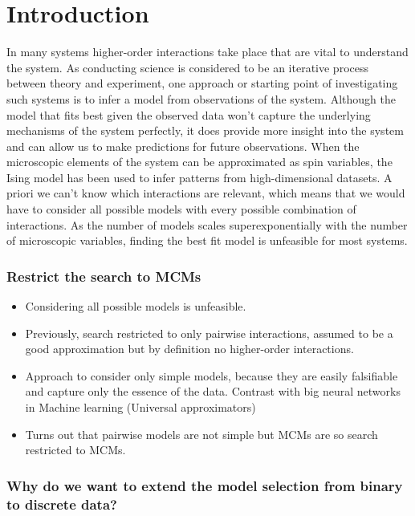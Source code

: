 \section{Introduction}

In many systems higher-order interactions take place that are vital to understand the system\cite{Battiston2021}.
As conducting science is considered to be an iterative process between theory and experiment\cite{Box1976}, one approach or starting point of investigating such systems is to infer a model from observations of the system\cite{Nguyen2017}.
Although the model that fits best given the observed data won't capture the underlying mechanisms of the system perfectly, it does provide more insight into the system and can allow us to make predictions for future observations.
When the microscopic elements of the system can be approximated as spin variables, the Ising model has been used to infer patterns from high-dimensional datasets\cite{Nguyen2017}.
A priori we can't know which interactions are relevant, which means that we would have to consider all possible models with every possible combination of interactions. 
As the number of models scales superexponentially with the number of microscopic variables\cite{Beretta2018}, finding the best fit model is unfeasible for most systems.

\subsubsection*{Restrict the search to MCMs}

\begin{itemize}
    \item Considering all possible models is unfeasible.
    \item Previously, search restricted to only pairwise interactions, assumed to be a good approximation but by definition no higher-order interactions.
    \item Approach to consider only simple models, because they are easily falsifiable and capture only the essence of the data. Contrast with big neural networks in Machine learning (Universal approximators)
    \item Turns out that pairwise models are not simple\cite{Beretta2018} but MCMs are so search restricted to MCMs\cite{Demulatier2020}.
\end{itemize}

\subsubsection*{Why do we want to extend the model selection from binary to discrete data?}

